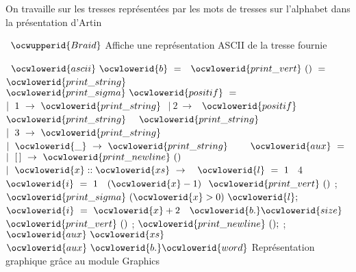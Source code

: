 \documentclass[12pt]{article}
\begin{document}
\allowbreak\ocwsection
\label{Braid_Print.ml:0}%
On travaille sur les tresses représentées par les mots de tresses sur 
   l'alphabet dans la présentation d'Artin

\ocweol
\label{Braid_Print.ml:220}%
\medskip
\ocwbegincode{}\ocwindent{0.00em}
~$\ocwupperid{Braid}$\ocweol
\ocwendcode{}\allowbreak\ocwsection
\label{Braid_Print.ml:234}%
Affiche une représentation ASCII de la tresse fournie

\ocweol
\label{Braid_Print.ml:294}%
\medskip
\ocwbegincode{}\ocwindent{0.00em}
~$\ocwlowerid{ascii}~\ocwlowerid{b}~=$\ocweol
\ocwindent{2.00em}
~$\ocwlowerid{print\_vert}~()~=$\ocweol
\ocwindent{4.00em}
$\ocwlowerid{print\_string}~$~\ocweol
\ocwindent{2.00em}
~$\ocwlowerid{print\_sigma}~\ocwlowerid{positif}~=~$\ocweol
\ocwindent{4.00em}
$\mid{}~1~\rightarrow{}~\ocwlowerid{print\_string}~$\ocweol
\ocwindent{4.00em}
$\mid{}~2~\rightarrow{}~$~$\ocwlowerid{positif}~$~$\ocwlowerid{print\_string}~$\ocweol
\ocwindent{13.00em}
~$\ocwlowerid{print\_string}~$\ocweol
\ocwindent{4.00em}
$\mid{}~3~\rightarrow{}~\ocwlowerid{print\_string}~$~\ocweol
\ocwindent{4.00em}
$\mid{}~\ocwlowerid{\_}~\rightarrow{}~\ocwlowerid{print\_string}~$~\ocweol
\ocwindent{2.00em}
~~$\ocwlowerid{aux}~=~$\ocweol
\ocwindent{4.00em}
$\mid{}~[\,]~\rightarrow{}~\ocwlowerid{print\_newline}~()$\ocweol
\ocwindent{4.00em}
$\mid{}~\ocwlowerid{x}::\ocwlowerid{xs}~\rightarrow{}~$~$\ocwlowerid{l}~=~1~$~4~\ocweol
\ocwindent{11.50em}
~$\ocwlowerid{i}~=~1~$~$(\ocwlowerid{x}-1)~$\ocweol
\ocwindent{12.00em}
$\ocwlowerid{print\_vert}~()$\ocweol
\ocwindent{11.50em}
;\ocweol
\ocwindent{11.50em}
$\ocwlowerid{print\_sigma}~(\ocwlowerid{x}>0)~\ocwlowerid{l};$\ocweol
\ocwindent{11.50em}
~$\ocwlowerid{i}~=~\ocwlowerid{x}+2~$~$\ocwlowerid{b.}\ocwlowerid{size}~$\ocweol
\ocwindent{12.00em}
$\ocwlowerid{print\_vert}~()$\ocweol
\ocwindent{11.50em}
;\ocweol
\ocwindent{11.50em}
$\ocwlowerid{print\_newline}~();$\ocweol
\ocwindent{9.50em}
;\ocweol
\ocwindent{9.50em}
$\ocwlowerid{aux}~\ocwlowerid{xs}~$\ocweol
\ocwindent{2.00em}
$\ocwlowerid{aux}~\ocwlowerid{b.}\ocwlowerid{word}$\ocweol
\ocwendcode{}\allowbreak\ocwsection
\label{Braid_Print.ml:1097}%
Représentation graphique grâce au module Graphics
\end{document}

